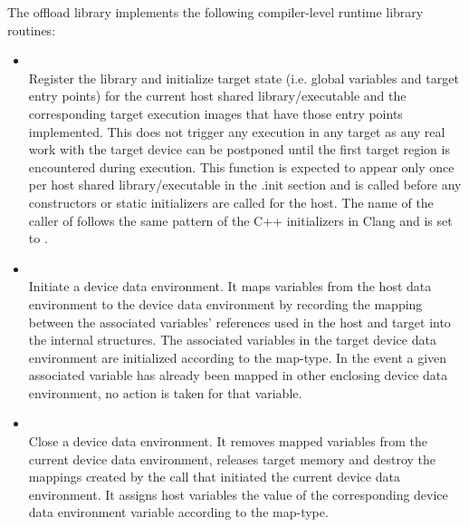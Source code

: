 The offload library implements the following compiler-level runtime library routines:
\begin{itemize}

  \item {}\\

    Register the \libomptarget{} library and initialize target state (i.e. global variables and target entry points) for the current host shared library/executable and the corresponding target execution images that have those entry points implemented. This does not trigger any execution in any target as any real work with the target device can be postponed until the first target region is encountered during execution. This function is expected to appear only once per host shared library/executable in the .init section and is called before any constructors or static initializers are called for the host. The name of the caller of  follows the same pattern of the C++ initializers in Clang and is set to . 

  \item {}\\

    Initiate a device data environment. It maps variables from the host data environment to the device data environment by recording the mapping between the associated variables’ references used in the host and target into the \libomptarget{} internal structures. The associated variables in the target device data environment are initialized according to the map-type. In the event a given associated variable has already been mapped in other enclosing device data environment, no action is taken for that variable.

  \item {}\\

    Close a device data environment. It removes mapped variables from the current device data environment, releases target memory and destroy the mappings created by the  call that initiated the current device data environment. It assigns host variables the value of the corresponding device data environment variable according to the map-type.


\end{itemize}
